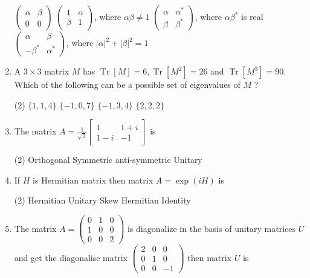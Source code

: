 \begin{enumerate}
\begin{tasks}
		\task[\textbf{a.}] $\left(\begin{array}{ll}\alpha & \beta \\ 0 & 0\end{array}\right)$
		\task[\textbf{b.}] $\left(\begin{array}{lr}1 & \alpha \\ \beta & 1\end{array}\right)$, where $\alpha \beta \neq 1$
		\task[\textbf{c.}] $\left(\begin{array}{cc}\alpha & \alpha^{*} \\ \beta & \beta^{*}\end{array}\right)$, where $\alpha \beta^{*}$ is real
		\task[\textbf{d.}]  $\left(\begin{array}{cc}\alpha & \beta \\ -\beta^{*} & \alpha^{*}\end{array}\right)$, where $|\alpha|^{2}+|\beta|^{2}=1$
	\end{tasks}
	\item A $3 \times 3$ matrix $M$ has $\operatorname{Tr}[M]=6, \operatorname{Tr}\left[M^{2}\right]=26$ and $\operatorname{Tr}\left[M^{3}\right]=90$. Which of the following can be a possible set of eigenvalues of $M$ ?
	 \begin{tasks}(2)
		\task[\textbf{a.}]$\{1,1,4\}$
		\task[\textbf{b.}]$\{-1,0,7\}$
		\task[\textbf{c.}]$\{-1,3,4\}$
		\task[\textbf{d.}] $\{2,2,2\}$
	\end{tasks}
	\item The matrix $A=\frac{1}{\sqrt{3}}\left[\begin{array}{cc}1 & 1+i \\ 1-i & -1\end{array}\right]$ is
	 \begin{tasks}(2)
		\task[\textbf{a.}]Orthogonal
		\task[\textbf{b.}] Symmetric
		\task[\textbf{c.}]anti-symmetric
		\task[\textbf{d.}] Unitary
	\end{tasks}
	\item If $H$ is Hermitian matrix then matrix $A=\exp (i H)$ is
	 \begin{tasks}(2)
		\task[\textbf{a.}] Hermitian
		\task[\textbf{b.}]Unitary
		\task[\textbf{c.}]Skew Hermitian
		\task[\textbf{d.}] Identity
	\end{tasks}
	\item The matrix $A=\left(\begin{array}{ccc}0 & 1 & 0 \\ 1 & 0 & 0 \\ 0 & 0 & 2\end{array}\right)$ is diagonalize in the basis of unitary matrices $U$ and get the diagonalise matrix $\left(\begin{array}{ccc}2 & 0 & 0 \\ 0 & 1 & 0 \\ 0 & 0 & -1\end{array}\right)$ then matrix $U$ is

\end{enumerate}

